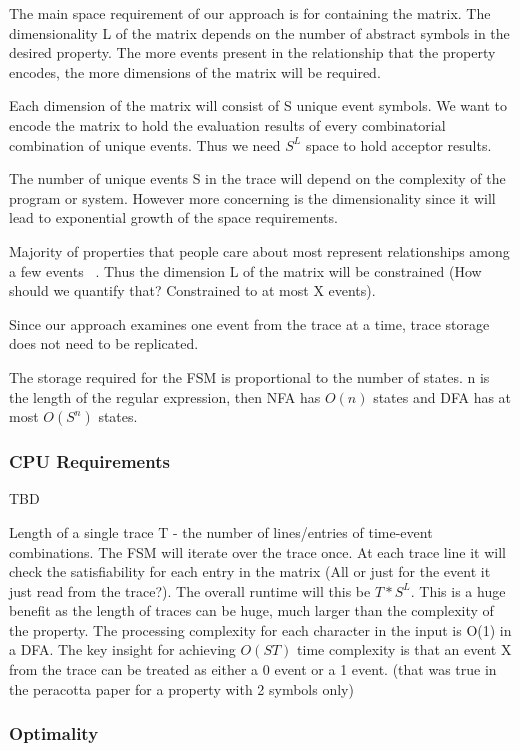 \documentclass[]{sigplanconf}
\begin{document}
The main space requirement of our approach is for containing the matrix. The dimensionality L of the matrix depends on the number of abstract symbols in the desired property. The more events present in the relationship that the property encodes, the more dimensions of the matrix will be required.

Each dimension of the matrix will consist of S unique event symbols. We want to encode the matrix to hold the evaluation results of every combinatorial combination of unique events. Thus we need $S^L$ space to hold acceptor results.

The number of unique events S in the trace will depend on the complexity of the program or system. However more concerning is the dimensionality since it will lead to exponential growth of the space requirements.

Majority of properties that people care about most represent relationships among a few events ~\cite{evans1, dwyer}. Thus the dimension L of the matrix will be constrained (How should we quantify that? Constrained to at most X events).

Since our approach examines one event from the trace at a time, trace storage does not need to be replicated.

The storage required for the FSM is proportional to the number of states. n is the length of the regular expression, then NFA has $O(n)$ states and DFA has at most $O(S^n)$ states.

\subsubsection{CPU Requirements}

TBD

Length of a single trace T - the number of lines/entries of time-event combinations.
The FSM will iterate over the trace once. At each trace line it will check the satisfiability for each entry in the matrix (All or just for the event it just read from the trace?). The overall runtime will this be $T * S^L$.
This is a huge benefit as the length of traces can be huge, much larger than the complexity of the property.
The processing complexity for each character in the input is O(1) in a DFA.
The key insight for achieving $O(ST)$ time complexity is that an event X from the trace can be treated as either a 0 event or a 1 event. (that was true in the peracotta paper for a property with 2 symbols only)

\subsubsection{Optimality}
\end{document}
